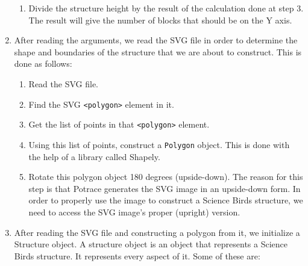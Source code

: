 \documentclass{dalthesis}
\begin{document}
\begin{enumerate}
\begin{enumerate}
    \item Divide the structure height by the result of the calculation done at step 3. The result will give the number of blocks that should be on the Y axis.
  \end{enumerate}

  \item After reading the arguments, we read the SVG file in order to determine the shape and boundaries of the structure that we are about to construct. This is done as follows:

  \begin{enumerate}
    \item Read the SVG file.
    \item Find the SVG \lstinline{<polygon>} element in it.
    \item Get the list of points in that \lstinline{<polygon>} element.
    \item Using this list of points, construct a \lstinline{Polygon} object. This is done with the help of a library called Shapely.
    \item Rotate this polygon object 180 degrees (upside-down). The reason for this step is that Potrace generates the SVG image in an upside-down form. In order to properly use the image to construct a Science Birds structure, we need to access the SVG image's proper (upright) version.
  \end{enumerate}

  \item After reading the SVG file and constructing a polygon from it, we initialize a Structure object. A structure object is an object that represents a Science Birds structure. It represents every aspect of it. Some of these are:


\end{enumerate}
\end{document}

